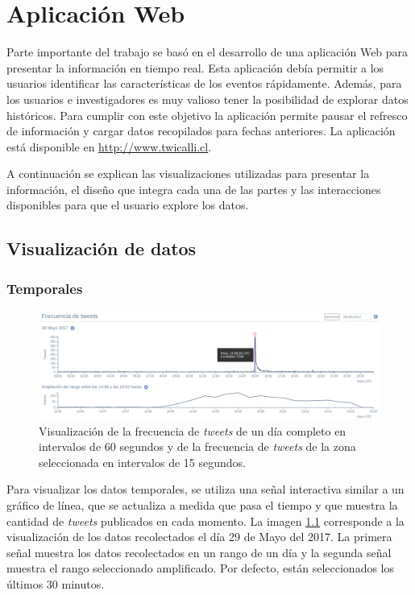 \chapter{Aplicación Web}
\label{cap:aplicacion}

Parte importante del trabajo se basó en el desarrollo de una aplicación Web para presentar la información en tiempo real. Esta aplicación debía permitir a los usuarios identificar las características de los eventos rápidamente.
%
Además, para los usuarios e investigadores es muy valioso tener la posibilidad de explorar datos históricos. Para cumplir con este objetivo la aplicación permite pausar el refresco de información y cargar datos recopilados para fechas anteriores. 
%
La aplicación está disponible en \url{http://www.twicalli.cl}.

A continuación se explican las visualizaciones utilizadas para presentar la información, el diseño que integra cada una de las partes y las interacciones disponibles para que el usuario explore los datos.

\section{Visualización de datos}
\label{sec:visualizacion}
	\subsection{Temporales}
	
	\begin{figure}[ht]
	  \centering
	  \includegraphics[trim={0 0 0 0}, clip, width=\textwidth]{imagenes/linea_de_tiempo_interactive.png}
	  \caption{Visualización de la frecuencia de \textit{tweets} de un día completo en intervalos de 60 segundos y de la frecuencia de \textit{tweets} de la zona seleccionada en intervalos de 15 segundos.}
	\label{fig:timeline}
	\end{figure}
		
	
	Para visualizar los datos temporales, se utiliza una señal interactiva similar a un gráfico de línea, que se actualiza a medida que pasa el tiempo y que muestra la cantidad de \textit{tweets} publicados en cada momento.
	La imagen \ref{fig:timeline} corresponde a la visualización de los datos recolectados el día 29 de Mayo del 2017.
	La primera señal muestra los datos recolectados en un rango de un día y la segunda señal muestra el rango seleccionado amplificado. Por defecto, están seleccionados los últimos 30 minutos.
		
